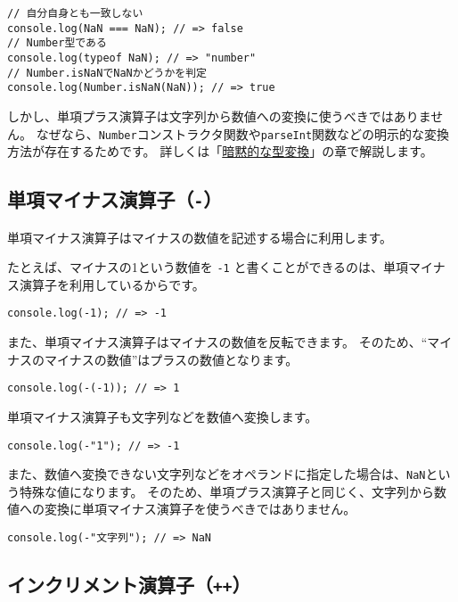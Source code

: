 \begin{lstlisting}
// 自分自身とも一致しない
console.log(NaN === NaN); // => false
// Number型である
console.log(typeof NaN); // => "number"
// Number.isNaNでNaNかどうかを判定
console.log(Number.isNaN(NaN)); // => true
\end{lstlisting}

しかし、単項プラス演算子は文字列から数値への変換に使うべきではありません。
なぜなら、\texttt{Number}コンストラクタ関数や\texttt{parseInt}関数などの明示的な変換方法が存在するためです。
詳しくは「\href{../implicit-coercion/README}{暗黙的な型変換}」の章で解説します。

\hypertarget{unary-minus-operator}{%
\subsection{\texorpdfstring{単項マイナス演算子（\texttt{-}）}{単項マイナス演算子（-）}}\label{unary-minus-operator}}

単項マイナス演算子はマイナスの数値を記述する場合に利用します。

たとえば、マイナスの1という数値を \texttt{-1}
と書くことができるのは、単項マイナス演算子を利用しているからです。

\begin{lstlisting}
console.log(-1); // => -1
\end{lstlisting}

また、単項マイナス演算子はマイナスの数値を反転できます。
そのため、``マイナスのマイナスの数値''はプラスの数値となります。

\begin{lstlisting}
console.log(-(-1)); // => 1
\end{lstlisting}

単項マイナス演算子も文字列などを数値へ変換します。

\begin{lstlisting}
console.log(-"1"); // => -1
\end{lstlisting}

また、数値へ変換できない文字列などをオペランドに指定した場合は、\texttt{NaN}という特殊な値になります。
そのため、単項プラス演算子と同じく、文字列から数値への変換に単項マイナス演算子を使うべきではありません。

\begin{lstlisting}
console.log(-"文字列"); // => NaN
\end{lstlisting}

\hypertarget{increment-operator}{%
\subsection{\texorpdfstring{インクリメント演算子（\texttt{++}）}{インクリメント演算子（++）}}\label{increment-operator}}

